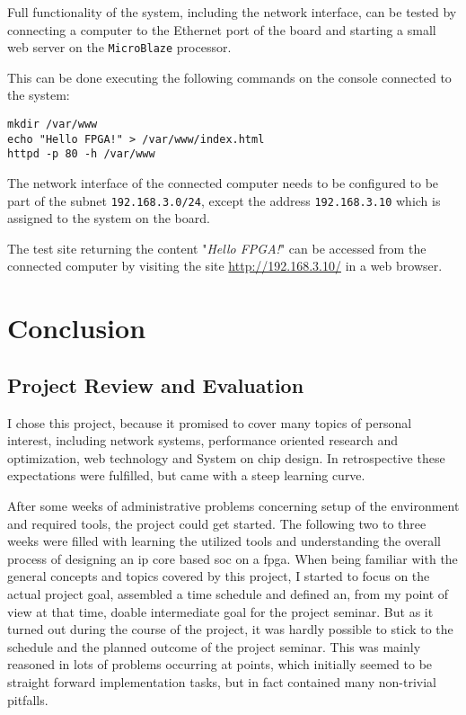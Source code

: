 Full functionality of the system, including the network interface, can be tested by connecting a computer to the Ethernet port of the board and starting a small web server on the \texttt{MicroBlaze} processor.

This can be done executing the following commands on the console connected to the system:

\begin{verbatim}
mkdir /var/www
echo "Hello FPGA!" > /var/www/index.html
httpd -p 80 -h /var/www
\end{verbatim}

The network interface of the connected computer needs to be configured to be part of the subnet \texttt{192.168.3.0/24}, except the address \texttt{192.168.3.10} which is assigned to the system on the board.

The test site returning the content "\textit{Hello FPGA!}" can be accessed from the connected computer by visiting the site \url{http://192.168.3.10/} in a web browser.

\chapter{Conclusion}

\section{Project Review and Evaluation}

I chose this project, because it promised to cover many topics of personal interest, including network systems, performance oriented research and optimization, web technology and System on chip design. In retrospective these expectations were fulfilled, but came with a steep learning curve.

After some weeks of administrative problems concerning setup of the environment and required tools, the project could get started. The following two to three weeks were filled with learning the utilized tools and understanding the overall process of designing an \gls{ip} core based \gls{soc} on a \gls{fpga}. When being familiar with the general concepts and topics covered by this project, I started to focus on the actual project goal, assembled a time schedule and defined an, from my point of view at that time, doable intermediate goal for the project seminar. But as it turned out during the course of the project, it was hardly possible to stick to the schedule and the planned outcome of the project seminar. This was mainly reasoned in lots of problems occurring at points, which initially seemed to be straight forward implementation tasks, but in fact contained many non-trivial pitfalls. 

